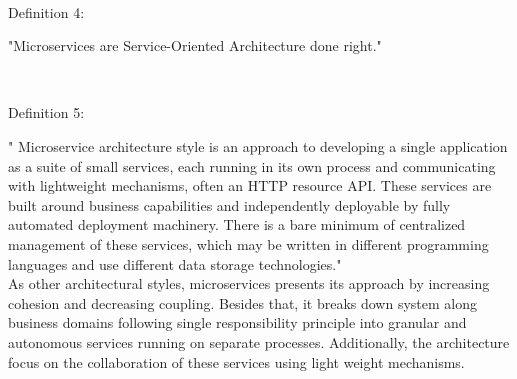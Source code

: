\\
\begin{shaded}Definition 4: \cite{Fowler:2014aa}\cite{Radchenko:2015aa}\end{shaded}
"Microservices are Service-Oriented Architecture done right."


\\
\begin{shaded}Definition 5: \cite{Fowler:2014aa}\end{shaded}
" Microservice architecture style is an approach to developing a single application as a suite of small services, each running in its own process and communicating with lightweight mechanisms, often an HTTP resource API. These services are built around business capabilities and independently deployable by fully automated deployment machinery. There is a bare minimum of centralized management of these services, which may be written in different programming languages and use different data storage technologies."
\\
As other architectural styles, microservices presents its approach by increasing cohesion and decreasing coupling. Besides that, it breaks down system along business domains following single responsibility principle into granular and autonomous services running on separate processes. Additionally, the architecture focus on the collaboration of these services using light weight mechanisms.

